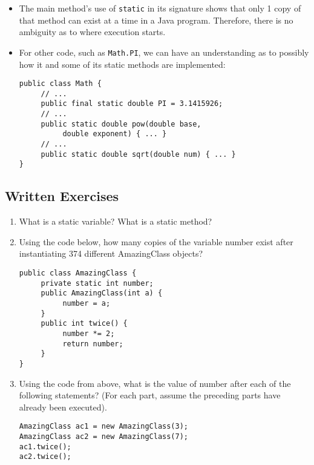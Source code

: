 \begin{itemize}
\item The main method's use of \verb|static| in its signature shows that only 1 copy of that method can exist at a time in a Java program. Therefore, there is no ambiguity as to where execution starts.
\item For other code, such as \verb|Math.PI|, we can have an understanding as to possibly how it and some of its static methods are implemented:
\begin{lstlisting}
public class Math {
     // ...
     public final static double PI = 3.1415926;
     // ...
     public static double pow(double base,
          double exponent) { ... }
     // ...
     public static double sqrt(double num) { ... }
}
\end{lstlisting}

\end{itemize}

\subsection{Written Exercises}

\setcounter{counter}{1}
\begin{enumerate}[label={\arabic{counter}\addtocounter{counter}{1}}.]

\item What is a static variable? What is a static method?

\item Using the code below, how many copies of the variable number exist after instantiating 374 different AmazingClass objects?
\begin{lstlisting}
public class AmazingClass {
     private static int number;
     public AmazingClass(int a) {
          number = a;
     }
     public int twice() {
          number *= 2;
          return number;
     }
}
\end{lstlisting}

\item Using the code from above, what is the value of number after each of the following statements? (For each part, assume the preceding parts have already been executed).
\begin{lstlisting}
AmazingClass ac1 = new AmazingClass(3);
AmazingClass ac2 = new AmazingClass(7);
ac1.twice();
ac2.twice();
\end{lstlisting}

\end{enumerate}